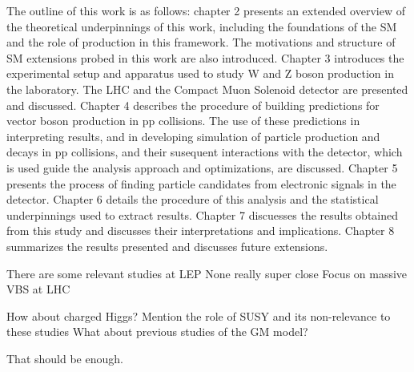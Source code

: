 The outline of this work is as follows: chapter 2 presents an extended 
overview of the theoretical underpinnings of this work, including the foundations
of the SM and the role of \EWWZ production in this framework. The motivations 
and structure of SM extensions probed in this work are also introduced.
Chapter 3 introduces the experimental setup and apparatus used to study W and 
Z boson production in the laboratory. The LHC and the Compact Muon Solenoid 
detector are presented and discussed. Chapter 4 describes the procedure of 
building predictions for vector boson production in pp collisions.
The use of these predictions in interpreting results, and in developing simulation
of particle production and decays in pp collisions, and their susequent interactions
with the detector, which is used 
guide the analysis approach and optimizations, are discussed. Chapter 5 presents
the process of finding particle candidates from electronic signals in the detector.
Chapter 6 details the procedure of this analysis and the statistical underpinnings
used to extract results. Chapter 7 discuesses the results obtained from this study
and discusses their interpretations and implications. Chapter 8 summarizes the
results presented and discusses future extensions.

There are some relevant studies at LEP
None really super close
Focus on massive VBS at LHC

How about charged Higgs?
Mention the role of SUSY and its non-relevance to these studies
What about previous studies of the GM model?

That should be enough.
